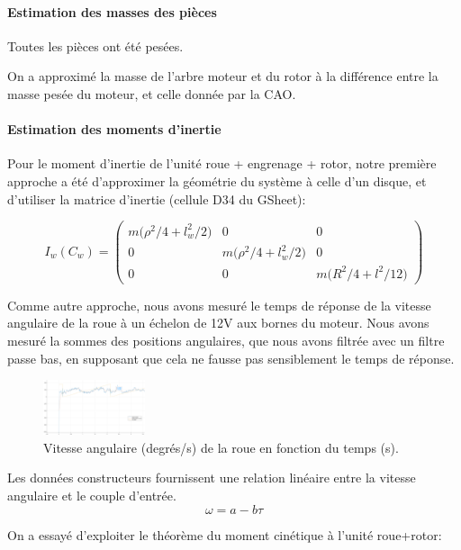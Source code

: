 \documentclass{report}
\begin{document}
\paragraph{Estimation des masses des pièces}
Toutes les pièces ont été pesées.

On a approximé la masse de l'arbre moteur et du rotor à la différence
entre la masse pesée du moteur, et celle donnée par la CAO.

\paragraph{Estimation des moments d'inertie}

Pour le moment d'inertie de l'unité roue + engrenage + rotor, 
notre première approche a été d'approximer la géométrie du système à celle d'un disque,
et d'utiliser la matrice d'inertie (cellule D34 du GSheet):

\begin{equation*}
    I_w(C_w) = 
    \begin{pmatrix}
        m \big(\rho^2/4 + l_w^2/2 \big) & 0 & 0 \\
        0 & m \big(\rho^2/4 + l_w^2/2 \big) & 0 \\
        0 & 0 & m \big(R^2/4 + l^2/12 \big)
    \end{pmatrix}
\end{equation*}

Comme autre approche, nous avons mesuré le temps de réponse de la 
vitesse angulaire de la roue à un échelon de 12V aux bornes du moteur.
Nous avons mesuré la sommes des positions angulaires, que nous avons filtrée 
avec un filtre passe bas, en supposant que cela ne fausse pas sensiblement le 
temps de réponse.

\begin{figure}[h]  %
    \centering
    \includegraphics[width=3cm]{figures/inertie_roue.png}
    \caption{Vitesse angulaire (degrés/s) de la roue en fonction du temps (s).}
\end{figure}

Les données constructeurs fournissent une relation 
linéaire entre la vitesse angulaire et le couple d'entrée. $$\omega = a - b\tau$$

On a essayé d'exploiter le théorème du moment cinétique à l'unité roue+rotor:
\end{document}
